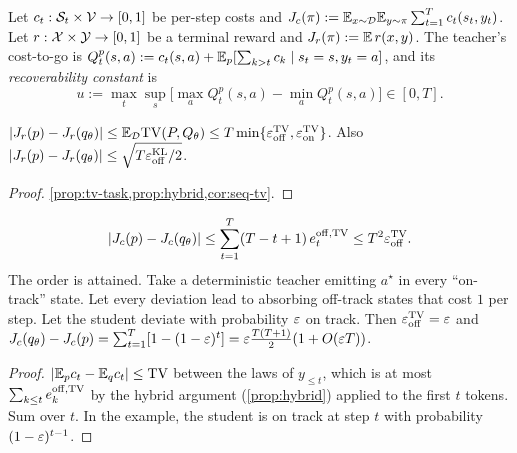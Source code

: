 Let $c_t:\mathcal{S}_t\times\mathcal{V}\to[0,1]$ be per-step costs and $J_c(\pi):=\mathbb{E}_{x\sim\mathcal{D}}\mathbb{E}_{y\sim\pi}\sum_{t=1}^Tc_t(s_t,y_t)$.
Let $r:\mathcal{X}\times\mathcal{Y}\to[0,1]$ be a terminal reward and $J_r(\pi):=\mathbb{E}\,r(x,y)$. The teacher's cost-to-go is
$Q^p_t(s,a):=c_t(s,a)+\mathbb{E}_p[\sum_{k>t}c_k\mid s_t=s,y_t=a]$, and its \emph{recoverability constant} is
\[
u:=\max_t\sup_s\big[\max_aQ^p_t(s,a)-\min_aQ^p_t(s,a)\big]\in[0,T].
\]

\begin{theorem}\label{thm:terminal}
\Pv $|J_r(p)-J_r(q_\theta)|\le\mathbb{E}_{\mathcal{D}}\mathrm{TV}(P,Q_\theta)\le T\min\{\varepsilon_{\mathrm{off}}^{\mathrm{TV}},\varepsilon_{\mathrm{on}}^{\mathrm{TV}}\}$. Also
$|J_r(p)-J_r(q_\theta)|\le\sqrt{T\varepsilon_{\mathrm{off}}^{\mathrm{KL}}/2}$.
\end{theorem}
\begin{proof}
\cref{prop:tv-task,prop:hybrid,cor:seq-tv}.
\end{proof}

\begin{theorem}\label{thm:quadratic}
\Pv\Ck
\[
|J_c(p)-J_c(q_\theta)|\le\sum_{t=1}^T(T-t+1)\,e^{\mathrm{off},\mathrm{TV}}_t\le T^2\varepsilon_{\mathrm{off}}^{\mathrm{TV}}.
\]
The order is attained. Take a deterministic teacher emitting $a^\star$ in every ``on-track'' state. Let
every deviation lead to absorbing off-track states that cost $1$ per step. Let the student deviate with
probability $\varepsilon$ on track. Then $\varepsilon_{\mathrm{off}}^{\mathrm{TV}}=\varepsilon$ and
$J_c(q_\theta)-J_c(p)=\sum_{t=1}^T[1-(1-\varepsilon)^t]=\varepsilon\frac{T(T+1)}2(1+O(\varepsilon T))$.
\end{theorem}
\begin{proof}
$|\mathbb{E}_pc_t-\mathbb{E}_{q}c_t|\le\mathrm{TV}$ between the laws of $y_{\le t}$, which is at most
$\sum_{k\le t}e^{\mathrm{off},\mathrm{TV}}_k$ by the hybrid argument (\cref{prop:hybrid}) applied to the first $t$
tokens. Sum over $t$. In the example, the student is on track at step $t$ with probability $(1-\varepsilon)^{t-1}$.
\end{proof}

